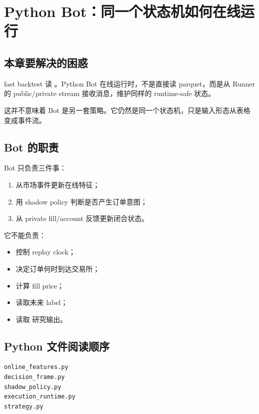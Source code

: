 \chapter{Python Bot：同一个状态机如何在线运行}

\section{本章要解决的困惑}

fast backtest 读 。Python Bot 在线运行时，不是直接读 parquet，而是从 Runner 的 public/private stream 接收消息，维护同样的 runtime-safe 状态。

这并不意味着 Bot 是另一套策略。它仍然是同一个状态机，只是输入形态从表格变成事件流。

\section{Bot 的职责}

Bot 只负责三件事：

\begin{enumerate}[leftmargin=2em]
  \item 从市场事件更新在线特征；
  \item 用 shadow policy 判断是否产生订单意图；
  \item 从 private fill/account 反馈更新闭合状态。
\end{enumerate}

它不能负责：

\begin{itemize}[leftmargin=2em]
  \item 控制 replay clock；
  \item 决定订单何时到达交易所；
  \item 计算 fill price；
  \item 读取未来 label；
  \item 读取  研究输出。
\end{itemize}


\section{Python 文件阅读顺序}

\begin{lstlisting}
online_features.py
decision_frame.py
shadow_policy.py
execution_runtime.py
strategy.py
\end{lstlisting}

